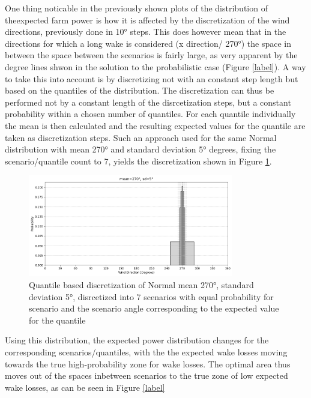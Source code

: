 One thing noticable in the previously shown plots of the distribution of theexpected farm power is how it is affected by the discretization of the wind directions, previously done in 10° steps. This does however mean that in the directions for which a long wake is considered (x direction/ 270°) the space in between the space between the scenarios  is fairly large, as very apparent  by the degree lines shwon in the solution to the probabilistic case (Figure \ref{label}). A way to take this into account is by discretizing not with an constant step length but based on the quantiles of the distribution. The discretization can thus be performed not by a constant length of the disrcetization steps, but a constant probability within a chosen number of quantiles. For each quantile individually the mean is then calculated and the resulting expected values for the quantile are taken as discretization steps. Such an approach used for the same Normal distribution with mean 270° and standard deviation 5° degrees, fixing the scenario/quantile count to 7, yields the discretization shown in Figure \ref{fig:wind_dist_opti_quantiles}. 

\begin{figure}[h] 
	\centering
	\includegraphics[width=0.8\textwidth]{figures/optimization/wind_dist_opti_quantiles.png} 
	\caption{Quantile based discretization of Normal mean 270°,  standard deviation 5°, disrcetized into 7 scenarios with equal probability for scenario and the scenario angle corresponding to the expected value for the quantile }
	\label{fig:wind_dist_opti_quantiles}
\end{figure} 

Using this distribution, the expected power distribution changes for the corresponding scenarios/quantiles, with the the expected wake losses moving towards the true high-probability zone for wake losses. The optimal area thus moves out of the spaces inbetween scenarios to the true zone of low expected wake losses, as can be seen in Figure \ref{label}

